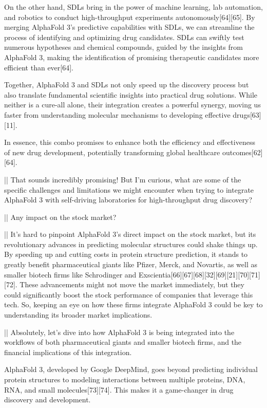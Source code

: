\begin{showcase}[title=Topic: AlphaFold 3]
On the other hand, SDLs bring in the power of machine learning, lab automation, and robotics to conduct high-throughput experiments autonomously[64][65]. By merging AlphaFold 3's predictive capabilities with SDLs, we can streamline the process of identifying and optimizing drug candidates. SDLs can swiftly test numerous hypotheses and chemical compounds, guided by the insights from AlphaFold 3, making the identification of promising therapeutic candidates more efficient than ever[64].

Together, AlphaFold 3 and SDLs not only speed up the discovery process but also translate fundamental scientific insights into practical drug solutions. While neither is a cure-all alone, their integration creates a powerful synergy, moving us faster from understanding molecular mechanisms to developing effective drugs[63][11].

In essence, this combo promises to enhance both the efficiency and effectiveness of new drug development, potentially transforming global healthcare outcomes[62][64].

||
That sounds incredibly promising! But I'm curious, what are some of the specific challenges and limitations we might encounter when trying to integrate AlphaFold 3 with self-driving laboratories for high-throughput drug discovery?

||
Any impact on the stock market?

||
It's hard to pinpoint AlphaFold 3's direct impact on the stock market, but its revolutionary advances in predicting molecular structures could shake things up. By speeding up and cutting costs in protein structure prediction, it stands to greatly benefit pharmaceutical giants like Pfizer, Merck, and Novartis, as well as smaller biotech firms like Schrodinger and Exscientia[66][67][68][32][69][21][70][71][72]. These advancements might not move the market immediately, but they could significantly boost the stock performance of companies that leverage this tech. So, keeping an eye on how these firms integrate AlphaFold 3 could be key to understanding its broader market implications.

||
Absolutely, let's dive into how AlphaFold 3 is being integrated into the workflows of both pharmaceutical giants and smaller biotech firms, and the financial implications of this integration.

AlphaFold 3, developed by Google DeepMind, goes beyond predicting individual protein structures to modeling interactions between multiple proteins, DNA, RNA, and small molecules[73][74]. This makes it a game-changer in drug discovery and development.


\end{showcase}
